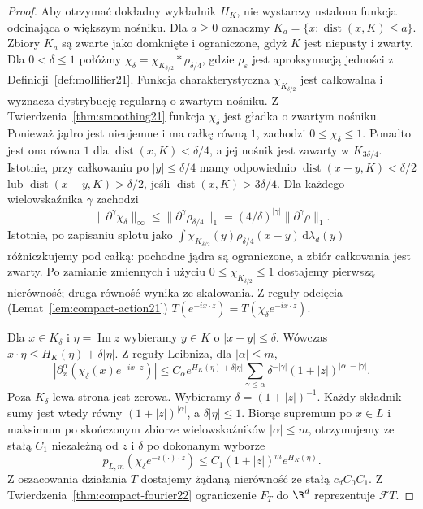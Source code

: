 \begin{proof}
Aby otrzymać dokładny wykładnik $H_K$, nie wystarczy
ustalona funkcja odcinająca o większym nośniku.
Dla $a\ge0$ oznaczmy
$K_a=\{x:\operatorname{dist}(x,K)\le a\}$.
Zbiory $K_a$ są zwarte jako domknięte i ograniczone,
gdyż $K$ jest niepusty i zwarty.
Dla $0<\delta\le1$ połóżmy
$\chi_\delta=\chi_{K_{\delta/2}}*\rho_{\delta/4}$,
gdzie $\rho_\varepsilon$ jest aproksymacją jedności
z Definicji~\ref{def:mollifier21}.
Funkcja charakterystyczna $\chi_{K_{\delta/2}}$
jest całkowalna i wyznacza dystrybucję regularną
o zwartym nośniku. Z Twierdzenia~\ref{thm:smoothing21}
funkcja $\chi_\delta$ jest gładka o zwartym nośniku.
Ponieważ jądro jest nieujemne i ma całkę równą $1$,
zachodzi $0\le\chi_\delta\le1$. Ponadto jest ona
równa $1$ dla $\operatorname{dist}(x,K)<\delta/4$,
a jej nośnik jest zawarty w $K_{3\delta/4}$. Istotnie, przy całkowaniu
po $|y|\le\delta/4$ mamy odpowiednio
$\operatorname{dist}(x-y,K)<\delta/2$ lub
$\operatorname{dist}(x-y,K)>\delta/2$, jeśli
$\operatorname{dist}(x,K)>3\delta/4$.
Dla każdego wielowskaźnika $\gamma$ zachodzi
\[
 \|\partial^\gamma\chi_\delta\|_\infty
 \le\|\partial^\gamma\rho_{\delta/4}\|_1
 = (4/\delta)^{|\gamma|}\|\partial^\gamma\rho\|_1.
\]
Istotnie, po zapisaniu splotu jako
$\int\chi_{K_{\delta/2}}(y)\rho_{\delta/4}(x-y)
\,\mathrm d\lambda_d(y)$ różniczkujemy pod całką:
pochodne jądra są ograniczone, a zbiór całkowania
jest zwarty. Po zamianie zmiennych i użyciu
$0\le\chi_{K_{\delta/2}}\le1$ dostajemy pierwszą
nierówność; druga równość wynika ze skalowania.
Z reguły odcięcia (Lemat~\ref{lem:compact-action21})
$T(e^{-ix\cdot z})=T(\chi_\delta e^{-ix\cdot z})$.

Dla $x\in K_\delta$ i $\eta=\operatorname{Im}z$
wybieramy $y\in K$ o $|x-y|\le\delta$.
Wówczas $x\cdot\eta\le H_K(\eta)+\delta|\eta|$.
Z reguły Leibniza, dla $|\alpha|\le m$,
\[
 |\partial_x^\alpha(\chi_\delta(x)e^{-ix\cdot z})|
 \le C_\alpha e^{H_K(\eta)+\delta|\eta|}
 \sum_{\gamma\le\alpha}\delta^{-|\gamma|}
                  (1+|z|)^{|\alpha|-|\gamma|}.
\]
Poza $K_\delta$ lewa strona jest zerowa. Wybieramy
$\delta=(1+|z|)^{-1}$. Każdy składnik sumy jest
wtedy równy $(1+|z|)^{|\alpha|}$, a
$\delta|\eta|\le1$. Biorąc supremum po $x\in L$
i maksimum po skończonym zbiorze wielowskaźników
$|\alpha|\le m$, otrzymujemy ze stałą $C_1$
niezależną od $z$ i $\delta$ po dokonanym wyborze
\[
 p_{L,m}(\chi_\delta e^{-i(\cdot)\cdot z})
 \le C_1(1+|z|)^m e^{H_K(\eta)}.
\]
Z oszacowania działania $T$ dostajemy żądaną
nierówność ze stałą $c_d C_0 C_1$.
Z Twierdzenia~\ref{thm:compact-fourier22} ograniczenie
$F_T$ do $\R^d$ reprezentuje $\mathcal FT$.
\end{proof}

